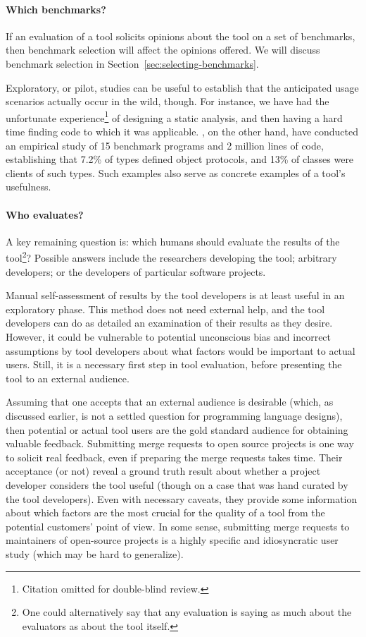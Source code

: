 \paragraph{Which benchmarks?} If an evaluation of a tool solicits opinions
about the tool on a set of benchmarks, then benchmark selection will affect
the opinions offered. We will discuss benchmark selection in 
Section~\ref{sec:selecting-benchmarks}.

Exploratory, 
or pilot, studies can be useful to establish that the
anticipated usage scenarios actually occur in the wild, though. For instance,
we have had the unfortunate experience\footnote{Citation omitted for double-blind review.} of designing a static analysis,
and then having a hard time finding code to which it was
applicable. \cite{beckman11:_empir_study_objec_protoc_wild}, on the
other hand, have conducted an empirical study of 15 benchmark programs
and 2 million lines of code, establishing that 7.2\% of types defined
object protocols, and 13\% of classes were clients of such types.
Such examples also serve as concrete examples of a tool's usefulness.


\paragraph{Who evaluates?}
A key remaining question is: which humans should evaluate the
results of the tool\footnote{One could alternatively say that any evaluation is saying as much about the evaluators as about the tool itself.}?  Possible answers include the researchers
developing the tool; arbitrary developers; or the developers of
particular software projects.

Manual self-assessment of results by the tool developers is at least
useful in an exploratory phase. This method does not need external
help, and the tool developers can do as detailed an examination of
their results as they desire. However, it could be vulnerable to
potential unconscious bias and incorrect assumptions by tool
developers about what factors would be important to actual
users. Still, it is a necessary first step in tool evaluation, before
presenting the tool to an external audience.

Assuming that one accepts that an external audience is desirable 
(which, as discussed earlier, is not a settled question
for programming language designs),
then potential or actual tool users are the gold standard audience for
obtaining valuable feedback. Submitting merge requests to open source
projects is one way to solicit real feedback, even if preparing the merge requests
takes time. Their acceptance (or
not) reveal a ground truth result about whether a project developer
considers the tool useful (though on a case that was hand curated by
the tool developers). Even with necessary caveats, they provide some information
about which factors are the most crucial for the quality of a tool
from the potential customers' point of view. 
In some sense, submitting merge requests to maintainers of open-source projects
is a highly specific and idiosyncratic user study (which may be hard to generalize).


